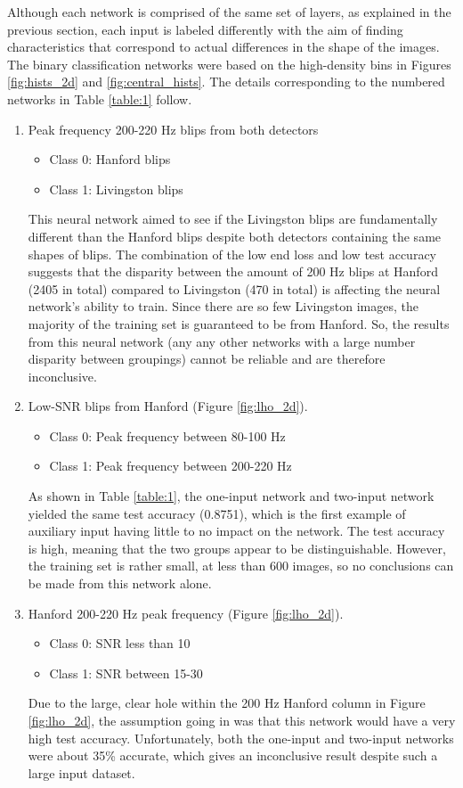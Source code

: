 \documentclass[a4paper]{article}
\begin{document}
Although each network is comprised of the same set of layers, as explained in the previous section, each input is labeled differently with the aim of finding characteristics that correspond to actual differences in the shape of the images. The binary classification networks were based on the high-density bins in Figures \ref{fig:hists_2d} and \ref{fig:central_hists}. The details corresponding to the numbered networks in Table \ref{table:1} follow. 
\begin{enumerate}

	\item Peak frequency 200-220 Hz blips from both detectors
	\begin{itemize}
		\item Class 0: Hanford blips
		\item Class 1: Livingston blips
	\end{itemize} This neural network aimed to see if the Livingston blips are fundamentally different than the Hanford blips despite both detectors containing the same shapes of blips. The combination of the low end loss and low test accuracy suggests that the disparity between the amount of 200 Hz blips at Hanford (2405 in total) compared to Livingston (470 in total) is affecting the neural network's ability to train. Since there are so few Livingston images, the majority of the training set is guaranteed to be from Hanford. So, the results from this neural network (any any other networks with a large number disparity between groupings) cannot be reliable and are therefore inconclusive.

	\item Low-SNR blips from Hanford (Figure \ref{fig:lho_2d}). 	
	\begin{itemize}
		\item Class 0: Peak frequency between 80-100 Hz
		\item Class 1: Peak frequency between 200-220 Hz
	\end{itemize} As shown in Table \ref{table:1}, the one-input network and two-input network yielded the same test accuracy (0.8751), which is the first example of auxiliary input having little to no impact on the network. The test accuracy is high, meaning that the two groups appear to be distinguishable. However, the training set is rather small, at less than 600 images, so no conclusions can be made from this network alone.

	\item Hanford 200-220 Hz peak frequency (Figure \ref{fig:lho_2d}). 
	\begin{itemize}
		\item Class 0: SNR less than 10
		\item Class 1: SNR between 15-30
	\end{itemize} Due to the large, clear hole within the 200 Hz Hanford column in Figure \ref{fig:lho_2d}, the assumption going in was that this network would have a very high test accuracy. Unfortunately, both the one-input and two-input networks were about 35\% accurate, which gives an inconclusive result despite such a large input dataset.
	

\end{enumerate}
\end{document}
